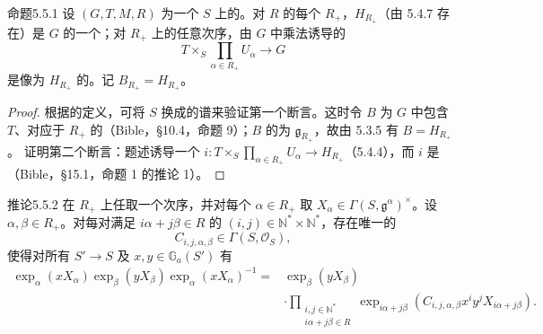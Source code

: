 \begin{SGAresult}{命题}{5.5.1}
设 $(G,T,M,R)$ 为一个 $S$ 上的。对 $R$ 的每个 $R_+$，$H_{R_+}$（由 5.4.7 存在）是 $G$ 的一个；对 $R_+$ 上的任意次序，由 $G$ 中乘法诱导的
\[T\times_S\prod_{\alpha\in R_+}U_\alpha\longrightarrow G\]
是像为 $H_{R_+}$ 的。记 $B_{R_+}=H_{R_+}$。
\end{SGAresult}
\begin{proof}
根据的定义，可将 $S$ 换成的谱来验证第一个断言。这时令 $B$ 为 $G$ 中包含 $T$、对应于 $R_+$ 的（Bible，\S 10.4，命题 9）；$B$ 的为 $\mathfrak g_{R_+}$，故由 5.3.5 有 $B=H_{R_+}$。
证明第二个断言：题述诱导一个 $i:T\times_S\prod_{\alpha\in R_+}U_\alpha\to H_{R_+}$（5.4.4），而 $i$ 是（Bible，\S 15.1，命题 1 的推论 1）。
\end{proof}
\begin{SGAresult}{推论}{5.5.2}
在 $R_+$ 上任取一个次序，并对每个 $\alpha\in R_+$ 取 $X_\alpha\in\Gamma(S,\mathfrak g^\alpha)^\times$。设 $\alpha,\beta\in R_+$。对每对满足 $i\alpha+j\beta\in R$ 的 $(i,j)\in\mathbb N^*\times\mathbb N^*$，存在唯一的
\[C_{i,j,\alpha,\beta}\in\Gamma(S,\mathcal O_S),\]
使得对所有 $S'\to S$ 及 $x,y\in\mathbb G_a(S')$ 有
\[\begin{split}
\exp_\alpha(xX_\alpha)\exp_\beta(yX_\beta)\exp_\alpha(xX_\alpha)^{-1}
={}&\exp_\beta(yX_\beta)\\[-2pt]
&\cdot\prod_{\substack{i,j\in\mathbb N^*\\i\alpha+j\beta\in R}}
\exp_{i\alpha+j\beta}(C_{i,j,\alpha,\beta}x^iy^jX_{i\alpha+j\beta}).
\end{split}\]
\end{SGAresult}
